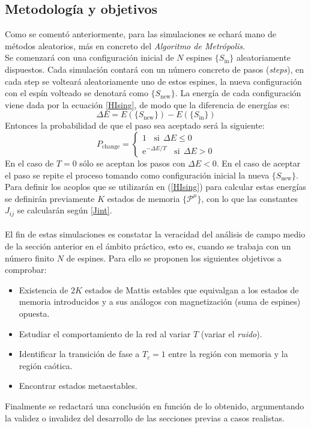 \documentclass[titlepage,12pt]{article}
\numberwithin{equation}{section}
\begin{document}
	\subsection{Metodología y objetivos}
	Como se comentó anteriormente, para las simulaciones se echará mano de métodos aleatorios, más en concreto del \textit{Algoritmo de Metrópolis}. \\
	Se comenzará con una configuración inicial de $N$ espines $\{ S_{\text{in}} \}$ aleatoriamente dispuestos. 
	Cada simulación contará con un número concreto de pasos (\textit{steps}), en cada step se volteará aleatoriamente uno de estos espines, la nueva configuración con el espín volteado se denotará como $\{ S_{\text{new}}\}$. La energía de cada configuración viene dada por la ecuación \eqref{HIsing}, de modo que la diferencia de energías es:
	\begin{equation}
	    \Delta E = E(\{S_{\text{new}}\}) - E(\{S_{\text{in}}\})
	\end{equation}
	Entonces la probabilidad de que el paso sea aceptado será la siguiente:
	\begin{equation}
	    P_{\text{change}} = \left\{
\begin{aligned}
    1 \ \ \ \ \text{si} \ \ \Delta E \leq 0 \\
    \text{e}^{-\Delta E/T} \ \ \ \ \text{si} \ \ \Delta E > 0
\end{aligned}
\right.
    \end{equation}
En el caso de $T = 0$ sólo se aceptan los pasos con $\Delta E < 0$. En el caso de aceptar el paso se repite el proceso tomando como configuración inicial la nueva $\{ S_{\text{new}} \}$.
\\
Para definir los acoplos que se utilizarán en (\ref{HIsing}) para calcular estas energías se definirán previamente $K$ estados de memoria $\{\mathcal{P}^{\mu}\}$, con lo que las constantes $J_{ij}$ se calcularán según \eqref{Jint}.
\\
\\
El fin de estas simulaciones es constatar la veracidad del análisis de campo medio de la sección anterior en el ámbito práctico, esto es, cuando se trabaja con un número finito $N$ de espines. Para ello se proponen los siguientes objetivos a comprobar:
\begin{itemize}
    \item Existencia de $2K$ estados de Mattis estables que equivalgan a los estados de memoria introducidos y a sus análogos con magnetización (suma de espines) opuesta.
    \item Estudiar el comportamiento de la red al variar $T$ (variar el \textit{ruido}).
    \item Identificar la transición de fase a $T_{c} = 1$ entre la región con memoria y la región caótica.
    \item Encontrar estados metaestables.
\end{itemize}
Finalmente se redactará una conclusión en función de lo obtenido, argumentando la validez o invalidez del desarrollo de las secciones previas a casos realistas.
\end{document}
